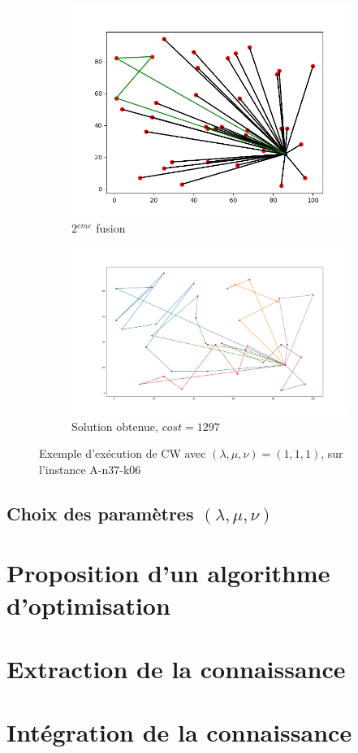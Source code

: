 \documentclass[a4paper,11pt]{article}%
\begin{document}
\begin{figure}
	\begin{figure}
	\includegraphics[scale=0.2]{CW2.png}
	\caption{2$^{eme}$ fusion}
	\end{figure}

 	\begin{figure}
	 \includegraphics[scale=0.09]{resCW101010.png}
	 \caption{Solution obtenue, $cost = 1297$}
	\end{figure}

\caption{Exemple d'exécution de CW avec $(\lambda, \mu, \nu) = (1,1,1)$, sur l'instance A-n37-k06}

\end{figure}
 
\subsection{Choix des paramètres $(\lambda, \mu, \nu)$}


\section{Proposition d'un algorithme d'optimisation}

\section{Extraction de la connaissance}

\section{Intégration de la connaissance} 



\end{document}
